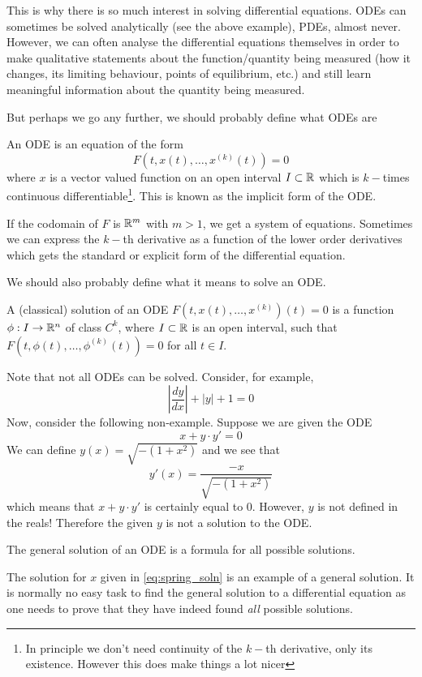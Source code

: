 This is why there is so much interest in solving differential equations. ODEs can sometimes be solved analytically (see the above example), PDEs, almost never. However, we can often analyse the differential equations themselves in order to make qualitative statements about the function/quantity being measured (how it changes, its limiting behaviour, points of equilibrium, etc.) and still learn meaningful information about the quantity being measured.

But perhaps we go any further, we should probably define what ODEs are
\begin{definition}
An ODE is an equation of the form
$$ F(t, x(t), \dots, x^{(k)}(t)) = 0 $$
where $x$ is a vector valued function on an open interval $I \subset \mathbb{R}$ which is $k-$times continuous differentiable\footnote{In principle we don't need continuity of the $k-$th derivative, only its existence. However this does make things a lot nicer}. This is known as the implicit form of the ODE.
\end{definition}
If the codomain of $F$ is $\mathbb{R}^m$ with $m > 1$, we get a system of equations. Sometimes we can express the $k-$th derivative as a function of the lower order derivatives which gets the standard or explicit form of the differential equation.

We should also probably define what it means to solve an ODE.
\begin{definition}
A (classical) solution of an ODE $F(t, x(t), \dots, x^{(k)})(t) = 0$ is a function  $\phi: I \to \mathbb{R}^n$ of class $C^k$, where $I \subset \mathbb{R}$ is an open interval, such that $F(t, \phi(t), \dots, \phi^{(k)}(t)) = 0$ for all $t \in I$.
\end{definition}
Note that not all ODEs can be solved. Consider, for example,
$$ \left|\frac{dy}{dx}\right| + \left|y\right| + 1 = 0 $$
Now, consider the following non-example. Suppose we are given the ODE
\begin{equation*}
    x + y \cdot y' = 0
\end{equation*}
We can define $y(x) = \sqrt{-(1 + x^2)}$ and we see that 
$$ y'(x) = \frac{-x}{\sqrt{-(1 + x^2)}} $$
which means that $x + y \cdot y'$ is certainly equal to 0. However, $y$ is not defined in the reals! Therefore the given $y$ is not a solution to the ODE.

\begin{definition}
The general solution of an ODE is a formula for all possible solutions.
\end{definition}
The solution for $x$ given in \eqref{eq:spring_soln} is an example of a general solution. It is normally no easy task to find the general solution to a differential equation as one needs to prove that they have indeed found \textit{all} possible solutions.

